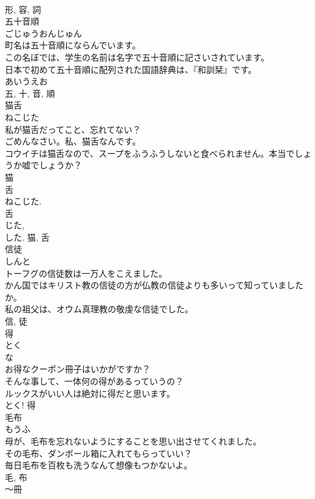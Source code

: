 \documentclass[8pt]{extreport}
\begin{document}
\begin{CJK}{UTF8}{min}
\\	形, 容, 詞	
\\	五十音順	
\\	ごじゅうおんじゅん	
\\	町名は五十音順にならんでいます。	
\\	この名ぼでは、学生の名前は名字で五十音順に記さいされています。	
\\	日本で初めて五十音順に配列された国語辞典は、『和訓栞』です。	
\\	あいうえお 
\\	五, 十, 音, 順	
\\	猫舌	
\\	ねこじた	
\\	私が猫舌だってこと、忘れてない？	
\\	ごめんなさい。私、猫舌なんです。	
\\	コウイチは猫舌なので、スープをふうふうしないと食べられません。本当でしょうか嘘でしょうか？	
\\	猫 
\\	舌 
\\	ねこじた. 
\\	舌 
\\	じた, 
\\	した.	猫, 舌	
\\	信徒	
\\	しんと	
\\	トーフグの信徒数は一万人をこえました。	
\\	かん国ではキリスト教の信徒の方が仏教の信徒よりも多いって知っていましたか。	
\\	私の祖父は、オウム真理教の敬虔な信徒でした。	
\\	信, 徒	
\\	得	
\\	とく	
\\	な 
\\	お得なクーポン冊子はいかがですか？	
\\	そんな事して、一体何の得があるっていうの？	
\\	ルックスがいい人は絶対に得だと思います。	
\\	とく!	得	
\\	毛布	
\\	もうふ	
\\	母が、毛布を忘れないようにすることを思い出させてくれました。	
\\	その毛布、ダンボール箱に入れてもらっていい？	
\\	毎日毛布を百枚も洗うなんて想像もつかないよ。	
\\	毛, 布	
\\	〜冊	

\end{CJK}
\end{document}
